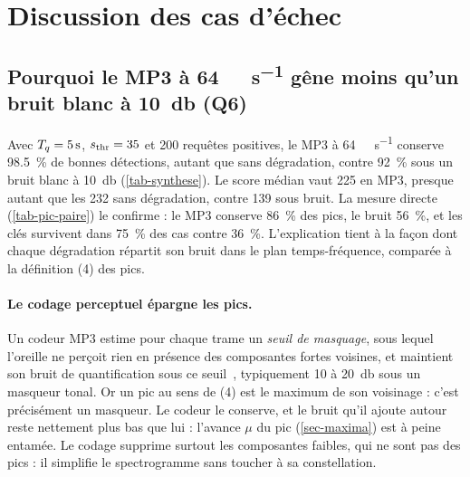 \section{Discussion des cas d'échec}
\label{sec-discussion}

\subsection{\texorpdfstring{Pourquoi le MP3 à \qty{64}{\kilo\bit\per\second} gêne moins qu'un bruit blanc à \qty{10}{\decibel} (Q6)}{Pourquoi le MP3 à 64 kbit/s gêne moins qu'un bruit blanc à 10 dB (Q6)}}
\label{sec-q6}

Avec $T_q = \qty{5}{\second}$, $s_{\mathrm{thr}} = 35$ et 200 requêtes positives, le MP3 à
\qty{64}{\kilo\bit\per\second} conserve \qty{98.5}{\percent} de bonnes détections, autant que
sans dégradation, contre \qty{92}{\percent} sous un bruit blanc à \qty{10}{\decibel}
(\cref{tab-synthese}). Le score médian vaut 225 en MP3, presque autant que les 232 sans
dégradation, contre 139 sous bruit. La mesure directe (\cref{tab-pic-paire}) le confirme : le
MP3 conserve \qty{86}{\percent} des pics, le bruit \qty{56}{\percent}, et les clés survivent
dans \qty{75}{\percent} des cas contre \qty{36}{\percent}. L'explication tient à la façon dont
chaque dégradation répartit son bruit dans le plan temps-fréquence, comparée à la définition
(4) des pics.

\paragraph{Le codage perceptuel épargne les pics.} Un codeur MP3 estime pour chaque trame
un \emph{seuil de masquage}, sous lequel l'oreille ne perçoit rien en présence des
composantes fortes voisines, et maintient son bruit de quantification sous ce
seuil~\cite{painter2000}, typiquement 10 à \qty{20}{\decibel} sous un masqueur tonal. Or un pic
au sens de (4) est le maximum de son voisinage : c'est précisément un masqueur. Le codeur le
conserve, et le bruit qu'il ajoute autour reste nettement plus bas que lui : l'avance $\mu$ du
pic (\cref{sec-maxima}) est à peine entamée. Le codage supprime surtout les composantes
faibles, qui ne sont pas des pics : il simplifie le spectrogramme sans toucher à sa
constellation.

